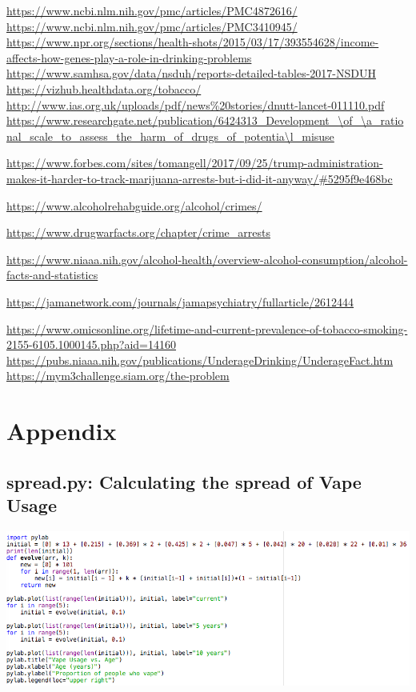 \documentclass{article}
\begin{document}
\begin{thebibliography}{1}
\url{https://www.ncbi.nlm.nih.gov/pmc/articles/PMC4872616/}
\url{https://www.ncbi.nlm.nih.gov/pmc/articles/PMC3410945/}
\url{https://www.npr.org/sections/health-shots/2015/03/17/393554628/income-affects-how-genes-play-a-role-in-drinking-problems}
\url{https://www.samhsa.gov/data/nsduh/reports-detailed-tables-2017-NSDUH}
\url{https://vizhub.healthdata.org/tobacco/}
\url{http://www.ias.org.uk/uploads/pdf/news\%20stories/dnutt-lancet-011110.pdf}
\url{https://www.researchgate.net/publication/6424313\_Development\_\of\_\a\_rational\_scale\_to\_assess\_the\_harm\_of\_drugs\_of\_potentia\l_misuse}

\url{https://www.forbes.com/sites/tomangell/2017/09/25/trump-administration-makes-it-harder-to-track-marijuana-arrests-but-i-did-it-anyway/#5295f9e468bc}

\url{https://www.alcoholrehabguide.org/alcohol/crimes/}

\url{https://www.drugwarfacts.org/chapter/crime\_arrests}

\url{https://www.niaaa.nih.gov/alcohol-health/overview-alcohol-consumption/alcohol-facts-and-statistics}

\url{https://jamanetwork.com/journals/jamapsychiatry/fullarticle/2612444} 

\url{https://www.omicsonline.org/lifetime-and-current-prevalence-of-tobacco-smoking-2155-6105.1000145.php?aid=14160}
\url{https://pubs.niaaa.nih.gov/publications/UnderageDrinking/UnderageFact.htm}
\url{https://mym3challenge.siam.org/the-problem}
\end{thebibliography}
\newpage

\section{Appendix}
\subsection{spread.py: Calculating the spread of Vape Usage}
\includegraphics[width=\textwidth]{spread}
\end{document}
